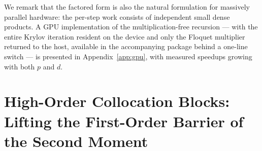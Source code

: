 \documentclass[preprint,12pt]{elsarticle}
\begin{document}
\begin{table}[ht!]
\centering
\caption{Measured wall-clock times of the second-moment spectral-radius computation for the periodic, delayed, stochastically excited oscillator chain ($\tau = T/2$, so the delay spans $r = p/2$ steps; the circular buffer of the implementation retains the $r{+}1$ history blocks plus one write slot, hence $D = \frac12 d(r{+}2)\big(d(r{+}2){+}1\big)$; $p$ = steps per period; It\^o-isometry quadrature $K=20$). ``Dense'' = classical pre-contracted operator (coefficient assembly + Krylov solve); ``factored'' = Kronecker-factored operator (assembly negligible). Agreement of $\rho(\mathcal{H})$ between the two forms is $\le 5\times10^{-15}$ wherever both run. (Xeon Gold 6154, single-threaded solve, Julia 1.12.)}
\label{tab:kron_scaling}
\end{table}

We remark that the factored form is also the natural formulation for massively parallel hardware: the per-step work consists of independent small dense products. A GPU implementation of the multiplication-free recursion --- with the entire Krylov iteration resident on the device and only the Floquet multiplier returned to the host, available in the accompanying package behind a one-line switch --- is presented in Appendix~\ref{app:gpu}, with measured speedups growing with both $p$ and $d$.

\section{High-Order Collocation Blocks: Lifting the First-Order Barrier of the Second Moment}
\label{sec:colloc}
\end{document}
